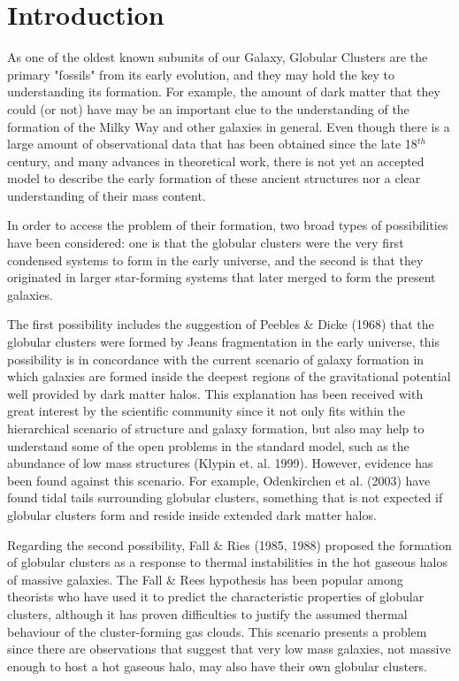 \chapter{Introduction}

As one of the oldest known subunits of our Galaxy, Globular Clusters are the primary "fossils" from its early evolution, and they may hold the key to understanding its formation. For example, the amount of dark matter that they could (or not) have may be an important clue to the understanding of the formation of the Milky Way and other galaxies in general. Even though there is a large amount of observational data that has been obtained since the late 18$^{th}$ century, and many advances in theoretical work, there is not yet an accepted model to describe the early formation of these ancient structures nor a clear understanding of their mass content. 

In order to access the problem of their formation, two broad types of possibilities have been considered: one is that the globular clusters were the very first condensed systems to form in the early universe, and the second is that they originated in larger star-forming systems that later merged to form the present galaxies. 

The first possibility includes the suggestion of Peebles \& Dicke (1968) that the globular clusters were formed by Jeans fragmentation in the early universe, this possibility is in concordance with the current scenario of galaxy formation in which galaxies are formed inside the deepest regions of the gravitational potential well provided by dark matter halos. This explanation has been received with great interest by the scientific community since it not only fits within the hierarchical scenario of structure and galaxy formation, but also may help to understand some of the open problems in the standard model, such as the abundance of low mass structures (Klypin et. al. 1999). However, evidence has been found against this scenario. For example, Odenkirchen et al. (2003) have found tidal tails surrounding globular clusters, something that is not expected if globular clusters form and reside inside extended dark matter halos.

Regarding the second possibility, Fall \& Ries (1985, 1988) proposed the formation of globular clusters as a response to thermal instabilities in the hot gaseous halos of massive galaxies. The Fall \& Rees hypothesis has been popular among theorists who have used it to predict the characteristic properties of globular clusters, although it has proven difficulties to justify the assumed thermal behaviour of the cluster-forming gas clouds. This scenario presents a problem since there are observations that suggest that very low mass galaxies, not massive enough to host a hot gaseous halo, may also have their own globular clusters.

